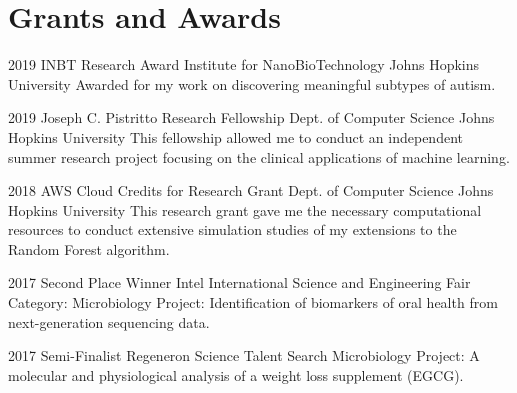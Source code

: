 \section{Grants and Awards}

\cventry
{2019}
{INBT Research Award}
{Institute for NanoBioTechnology}
{Johns Hopkins University}
{}
{Awarded for my work on discovering meaningful subtypes of autism.}

\cventry
{2019}
{Joseph C. Pistritto Research Fellowship}
{Dept. of Computer Science}
{Johns Hopkins University}
{}
{This fellowship allowed me to conduct an independent summer research project focusing on the clinical applications of machine learning.}

\cventry
{2018}
{AWS Cloud Credits for Research Grant}
{Dept. of Computer Science}
{Johns Hopkins University}
{}
{This research grant gave me the necessary computational resources to conduct extensive simulation studies of my extensions to the Random Forest algorithm.}

\cventry
{2017}
{Second Place Winner}
{Intel International Science and Engineering Fair}
{Category: Microbiology}
{}
{Project: Identification of biomarkers of oral health from next-generation sequencing data.}

\cventry
{2017}
{Semi-Finalist}
{Regeneron Science Talent Search}
{Microbiology}
{}
{Project: A molecular and physiological analysis of a weight loss supplement (EGCG).}